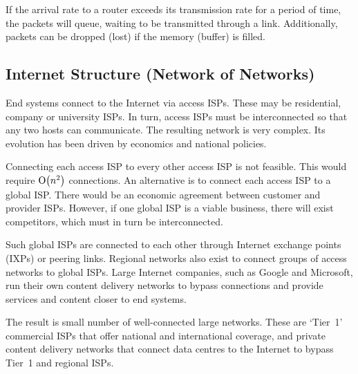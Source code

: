 If the arrival rate to a router exceeds its transmission rate for a period of time, the packets will queue, waiting to be transmitted through a link.
Additionally, packets can be dropped (lost) if the memory (buffer) is filled.

\subsection{Internet Structure (Network of Networks)}

End systems connect to the Internet via access ISPs.
These may be residential, company or university ISPs.
In turn, access ISPs must be interconnected so that any two hosts can communicate.
The resulting network is very complex.
Its evolution has been driven by economics and national policies.

Connecting each access ISP to every other access ISP is not feasible.
This would require \( \textup{O}\!\left( n^2 \right) \) connections.
An alternative is to connect each access ISP to a global ISP\@.
There would be an economic agreement between customer and provider ISPs.
However, if one global ISP is a viable business, there will exist competitors, which must in turn be interconnected.

Such global ISPs are connected to each other through Internet exchange points (IXPs) or peering links.
Regional networks also exist to connect groups of access networks to global ISPs.
Large Internet companies, such as Google and Microsoft, run their own content delivery networks to bypass connections and provide services and content closer to end systems.

The result is small number of well-connected large networks.
These are `Tier~1' commercial ISPs that offer national and international coverage, and private content delivery networks that connect data centres to the Internet to bypass Tier~1 and regional ISPs.
